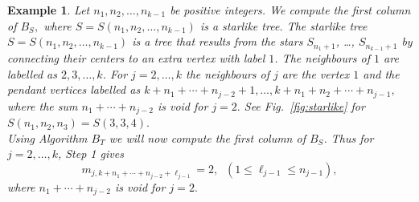 \documentclass[12pt]{article}
\newtheorem{example}{Example}
\begin{document}
\begin{example}
{\rm
Let $n_1, n_2,  \ldots, n_{k-1}$ be positive integers. We compute the first column of $B_{S},$ where $S=S(n_1,n_2, \ldots, n_{k-1})$ is a starlike tree.  The starlike tree $S=S(n_1,n_2, \ldots, n_{k-1})$ is a tree that results from the stars $S_{n_{1}+1}$, \ldots, $S_{n_{k-1}+1}$ by connecting their centers to an extra vertex with label $1$. The neighbours of $1$ are labelled as $2,3, \ldots , k$. %
For $j= 2, \ldots, k$ the neighbours of $j$ are the vertex $1$ and the pendant vertices labelled as $ k+n_{1}+\cdots+ n_{j-2} +1, \ldots,k+ n_{1}+n_{2} + \cdots +n_{j-1},$ where the sum $n_{1}+\cdots+ n_{j-2}$ is void for $j=2.$
See Fig.~\ref{fig:starlike} for $S(n_1, n_2, n_3)=S(3,3,4).$\\
Using Algorithm $B_T$ we will now compute the first column of $B_S$.
Thus for $j=2, \ldots, k$, Step 1 gives
$$m_{j, k+n_{1}+\cdots+ n_{j-2}+\ell_{j-1}}=2, \;\;(1\leq \ell_{j-1} \leq n_{j-1}), $$ where  $n_{1}+\cdots+ n_{j-2}$ is void for $j=2.$
%
\\

}
\end{example}
\end{document}

